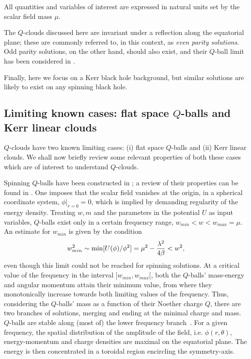 All quantities and variables of interest are expressed in natural units set by the scalar field mass $\mu$.

The $Q$-clouds discussed here are invariant under a reflection along  
the equatorial plane; these are commonly referred to, in this context, as \textit{even parity solutions}. Odd parity
solutions, on the other hand, should also exist, and their $Q$-ball limit has been considered in 
\cite{Volkov:2002aj,Kleihaus:2007vk}.

Finally, here we focus on a Kerr black hole background, but similar solutions are likely to exist on any spinning black hole.

\subsection{Limiting known cases: flat space $Q$-balls and Kerr linear clouds}



$Q$-clouds have two known limiting cases: (i) flat space $Q$-balls and (ii) Kerr linear clouds. We shall now briefly review some relevant properties of both these cases which are of interest to understand $Q$-clouds. 

\bigskip


Spinning $Q$-balls have been constructed  in 
\cite{Volkov:2002aj,Kleihaus:2005me};
a review of their properties can be found in \cite{Radu:2008pp}.
%
One imposes that the scalar field
vanishes at the origin, in a spherical coordinate system,  $\phi|_{r=0}=0$, which is implied by demanding regularity of the energy density.
Treating $w,m$ and the parameters in the potential $U$
as input variables, $Q$-balls 
exist only in a certain frequency range, 
$w_{min} < w < w_{max}=\mu$.
An estimate for $w_{min}$
is given by the condition 
\cite{Volkov:2002aj,Kleihaus:2005me}
\begin{eqnarray}
 w_{min}^2\sim  {\rm min} [U(\phi)/\phi^2]=\mu^2-\frac{\lambda^2}{4\beta}<w^2,
\end{eqnarray}
even though this limit could not be reached for spinning solutions.
%
At a critical value of the frequency in the interval $]w_{min}, w_{max}[$, 
both the $Q$-balls' mass-energy and angular momentum attain their minimum value,
from where they monotonically increase towards both limiting values
of the frequency.
%
Thus, considering the $Q$-balls' mass as a function of their Noether charge $Q$,
there are two branches of solutions, merging and ending
at the minimal charge and mass. 
$Q$-balls are stable along (most of) the lower frequency branch~\cite{Radu:2008pp}.
%
For a given frequency, the spatial distribution of the amplitude of the field, i.e. $\phi(r,\theta)$, energy-momentum and charge densities are maximal on the equatorial plane.
The energy is then concentrated in a toroidal region encircling the symmetry-axis.

